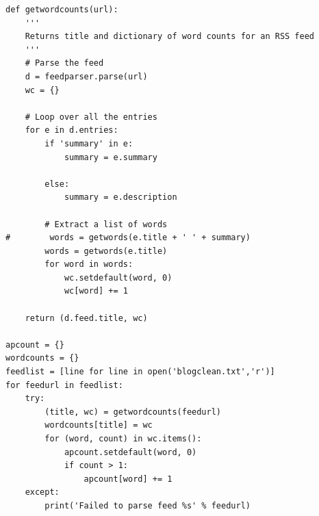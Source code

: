 \documentclass[10pt,letterpaper]{article}
\begin{document}
\begin{lstlisting}
def getwordcounts(url):
    '''
    Returns title and dictionary of word counts for an RSS feed
    '''
    # Parse the feed
    d = feedparser.parse(url)
    wc = {}

    # Loop over all the entries
    for e in d.entries:
        if 'summary' in e:
            summary = e.summary

        else:
            summary = e.description

        # Extract a list of words
#        words = getwords(e.title + ' ' + summary)
        words = getwords(e.title)
        for word in words:
            wc.setdefault(word, 0)
            wc[word] += 1

    return (d.feed.title, wc)

apcount = {}
wordcounts = {}
feedlist = [line for line in open('blogclean.txt','r')]
for feedurl in feedlist:
    try:
        (title, wc) = getwordcounts(feedurl)
        wordcounts[title] = wc
        for (word, count) in wc.items():
            apcount.setdefault(word, 0)
            if count > 1:
                apcount[word] += 1
    except:
        print('Failed to parse feed %s' % feedurl)

\end{lstlisting}
\end{document}
